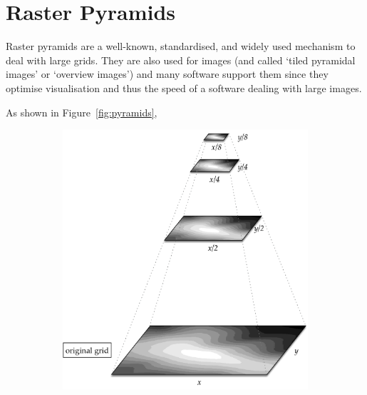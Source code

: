 %
\section{Raster Pyramids}


Raster pyramids are a well-known, standardised, and widely used mechanism to deal with large grids.
They are also used for images (and called `tiled pyramidal images' or `overview images') and many software support them since they optimise visualisation and thus the speed of a software dealing with large images.

As shown in Figure~\ref{fig:pyramids}, 
\begin{figure}
  \centering
  \begin{subfigure}[b]{0.6\linewidth}
    \centering
    \includegraphics[width=\textwidth]{figs/pyramids.pdf}
    \caption{}
  \end{subfigure}
  \qquad%
  \begin{subfigure}[b]{0.15\linewidth}
    \centering

\end{subfigure}
\end{figure}

